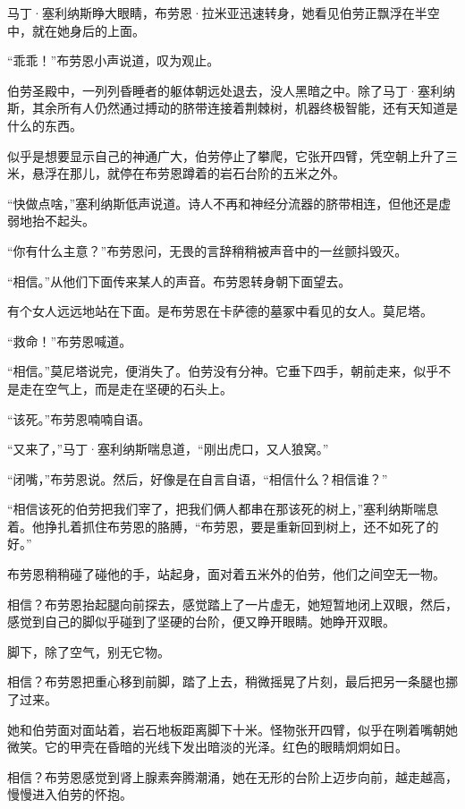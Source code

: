 \documentclass[AutoFakeBold=true]{book}
\begin{document}
\vspace*{1em}

马丁·塞利纳斯睁大眼睛，布劳恩·拉米亚迅速转身，她看见伯劳正飘浮在半空中，就在她身后的上面。

``乖乖！''布劳恩小声说道，叹为观止。

伯劳圣殿中，一列列昏睡者的躯体朝远处退去，没人黑暗之中。除了马丁·塞利纳斯，其余所有人仍然通过搏动的脐带连接着荆棘树，机器终极智能，还有天知道是什么的东西。

似乎是想要显示自己的神通广大，伯劳停止了攀爬，它张开四臂，凭空朝上升了三米，悬浮在那儿，就停在布劳恩蹲着的岩石台阶的五米之外。

``快做点啥，''塞利纳斯低声说道。诗人不再和神经分流器的脐带相连，但他还是虚弱地抬不起头。

``你有什么主意？''布劳恩问，无畏的言辞稍稍被声音中的一丝颤抖毁灭。

``相信。''从他们下面传来某人的声音。布劳恩转身朝下面望去。

有个女人远远地站在下面。是布劳恩在卡萨德的墓冢中看见的女人。莫尼塔。

``救命！''布劳恩喊道。

``相信。''莫尼塔说完，便消失了。伯劳没有分神。它垂下四手，朝前走来，似乎不是走在空气上，而是走在坚硬的石头上。

``该死。''布劳恩喃喃自语。

``又来了，''马丁·塞利纳斯喘息道，``刚出虎口，又人狼窝。''

``闭嘴，''布劳恩说。然后，好像是在自言自语，``相信什么？相信谁？''

``相信该死的伯劳把我们宰了，把我们俩人都串在那该死的树上，''塞利纳斯喘息着。他挣扎着抓住布劳恩的胳膊，``布劳恩，要是重新回到树上，还不如死了的好。''

布劳恩稍稍碰了碰他的手，站起身，面对着五米外的伯劳，他们之间空无一物。

{\kaishu 相信？}布劳恩抬起腿向前探去，感觉踏上了一片虚无，她短暂地闭上双眼，然后，感觉到自己的脚似乎碰到了坚硬的台阶，便又睁开眼睛。她睁开双眼。

脚下，除了空气，别无它物。

{\kaishu 相信？}布劳恩把重心移到前脚，踏了上去，稍微摇晃了片刻，最后把另一条腿也挪了过来。

她和伯劳面对面站着，岩石地板距离脚下十米。怪物张开四臂，似乎在咧着嘴朝她微笑。它的甲壳在昏暗的光线下发出暗淡的光泽。红色的眼睛炯炯如日。

{\kaishu 相信？}布劳恩感觉到肾上腺素奔腾潮涌，她在无形的台阶上迈步向前，越走越高，慢慢进入伯劳的怀抱。
\end{document}
